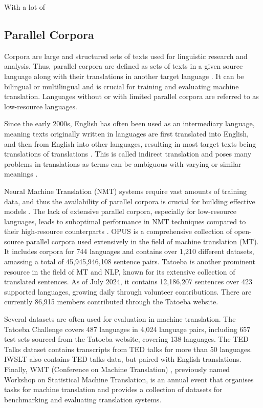 \documentclass[a4paper, 11pt]{article}
\begin{document}
With a lot of

\subsection{Parallel Corpora}

Corpora are large and structured sets of texts used for linguistic research and analysis. Thus, parallel corpora are defined as sets of texts in a given source language along with their translations in another target language \cite{lefer-2020-parallel-corpora}. It can be bilingual or multilingual and is crucial for training and evaluating machine translation. Languages without or with limited parallel corpora are referred to as low-resource languages.

Since the early 2000s, English has often been used as an intermediary language, meaning texts originally written in languages are first translated into English, and then from English into other languages, resulting in most target texts being translations of translations \cite{lefer-2020-parallel-corpora}. This is called indirect translation and poses many problems in translations as terms can be ambiguous with varying or similar meanings \cite{rosa-2017-indirect-translation-problems}.

Neural Machine Translation (NMT) systems require vast amounts of training data, and thus the availability of parallel corpora is crucial for building effective models \cite{koehn-2017-challenges}. The lack of extensive parallel corpora, especially for low-resource languages, leads to suboptimal performance in NMT techniques compared to their high-resource counterparts \cite{ranathunga-2023-nmt-low-res}. OPUS \cite{opus} is a comprehensive collection of open-source parallel corpora used extensively in the field of machine translation (MT). It includes corpora for 744 languages and contains over 1,210 different datasets, amassing a total of 45,945,946,108 sentence pairs. Tatoeba \cite{tatoeba} is another prominent resource in the field of MT and NLP, known for its extensive collection of translated sentences. As of July 2024, it contains 12,186,207 sentences over 423 supported languages, growing daily through volunteer contributions. There are currently
86,915 members contributed through the Tatoeba website.

Several datasets are often used for evaluation in machine translation. The Tatoeba Challenge \cite{tiedemann-2020-tatoeba-challenge} covers 487 languages in 4,024 language pairs, including 657 test sets sourced from the Tatoeba website, covering 138 languages. The TED Talks dataset \cite{ye-2018-word-embeddings-ted} contains transcripts from TED talks for more than 50 languages. IWSLT \cite{agarwal-iwstl-2023} also contains TED talks data, but paired with English translations. Finally, WMT (Conference on Machine Translation) \cite{barrault-2020-wmt}, previously named Workshop on Statistical Machine Translation, is an annual event that organises tasks for machine translation and provides a collection of datasets for benchmarking and evaluating translation systems.
\end{document}
